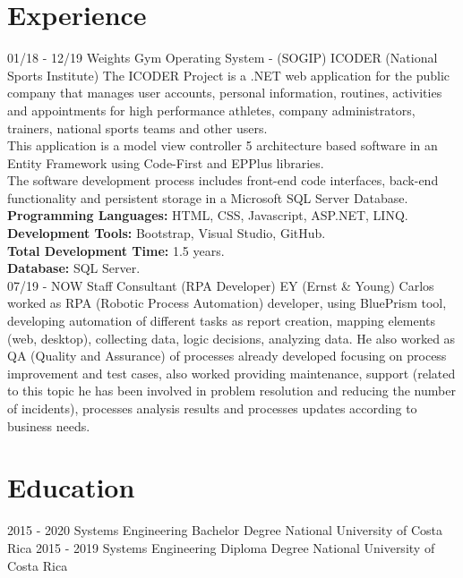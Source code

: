 \documentclass[]{friggeri-cv}
\begin{document}
\section{Experience}
\begin{entrylist}
  \entry
    {01/18 - 12/19}
    {Weights Gym Operating System - (SOGIP)}
    {ICODER (National Sports Institute)}
    {The ICODER Project is a .NET web application for the public company that manages user accounts, personal information, routines, activities and appointments for high performance athletes, company administrators, trainers, national sports teams and other users. \\
    This application is a model view controller 5 architecture based software in an Entity Framework using Code-First and EPPlus libraries. \\
    The software development process includes front-end code interfaces, back-end functionality and persistent storage in a Microsoft SQL Server Database. \\
    \textbf{Programming Languages:} HTML, CSS, Javascript, ASP.NET, LINQ. \\
    \textbf{Development Tools:} Bootstrap, Visual Studio, GitHub. \\
    \textbf{Total Development Time:} 1.5 years. \\
    \textbf{Database:} SQL Server. } \\
    
    \entry
    {07/19 - NOW}
    {Staff Consultant (RPA Developer)}
    {EY (Ernst \& Young)}
    {Carlos worked as RPA (Robotic Process Automation) developer, using BluePrism tool, developing automation of different tasks as report creation, mapping elements (web, desktop), collecting data, logic decisions, analyzing data. He also worked as QA (Quality and Assurance) of processes already developed focusing on process improvement and test cases, also worked providing maintenance, support (related to this topic he has been involved in problem resolution and reducing the number of incidents), processes analysis results and processes updates according to business needs. }
    
\end{entrylist}

\section{Education}
\begin{entrylist}
  \entry
    {2015 - 2020}
    {Systems Engineering Bachelor Degree}
    {National University of Costa Rica}
    {}
  \entry
    {2015 - 2019}
    {Systems Engineering Diploma Degree}
    {National University of Costa Rica}
    {}
\end{entrylist}
\end{document}
